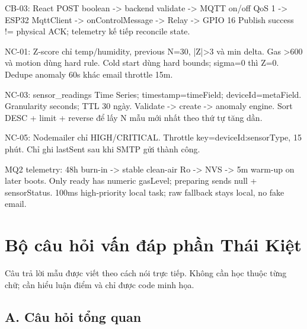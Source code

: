 \documentclass[11pt,oneside,openany]{book}
\newenvironment{Shaded}{\begin{snugshade}}{\end{snugshade}}
\newcommand{\NormalTok}[1]{\textcolor[rgb]{0.81,0.81,0.76}{#1}}
\renewenvironment{Shaded}{%
  \def\FrameCommand{\fboxsep=8pt\colorbox{shadecolor}}%
  \MakeFramed{\advance\hsize-\width\FrameRestore}%
}{\endMakeFramed}
\begin{document}
\begin{Shaded}
\begin{Highlighting}[]
\NormalTok{CB{-}03:}
\NormalTok{React POST boolean {-}\textgreater{} backend validate {-}\textgreater{} MQTT on/off QoS 1}
\NormalTok{{-}\textgreater{} ESP32 MqttClient {-}\textgreater{} onControlMessage {-}\textgreater{} Relay {-}\textgreater{} GPIO 16}
\NormalTok{Publish success != physical ACK; telemetry kế tiếp reconcile state.}

\NormalTok{NC{-}01:}
\NormalTok{Z{-}score chỉ temp/humidity, previous N=30, |Z|\textgreater{}3 và min delta.}
\NormalTok{Gas \textgreater{}600 và motion dùng hard rule.}
\NormalTok{Cold start dùng hard bounds; sigma=0 thì Z=0.}
\NormalTok{Dedupe anomaly 60s khác email throttle 15m.}

\NormalTok{NC{-}03:}
\NormalTok{sensor\_readings Time Series; timestamp=timeField; deviceId=metaField.}
\NormalTok{Granularity seconds; TTL 30 ngày.}
\NormalTok{Validate {-}\textgreater{} create {-}\textgreater{} anomaly engine.}
\NormalTok{Sort DESC + limit + reverse để lấy N mẫu mới nhất theo thứ tự tăng dần.}

\NormalTok{NC{-}05:}
\NormalTok{Nodemailer chỉ HIGH/CRITICAL.}
\NormalTok{Throttle key=deviceId:sensorType, 15 phút.}
\NormalTok{Chỉ ghi lastSent sau khi SMTP gửi thành công.}

\NormalTok{MQ2 telemetry:}
\NormalTok{48h burn{-}in {-}\textgreater{} stable clean{-}air Ro {-}\textgreater{} NVS {-}\textgreater{} 5m warm{-}up on later boots.}
\NormalTok{Only ready has numeric gasLevel; preparing sends null + sensorStatus.}
\NormalTok{100ms high{-}priority local task; raw fallback stays local, no fake email.}
\end{Highlighting}
\end{Shaded}

\chapter{Bộ câu hỏi vấn đáp phần Thái
Kiệt}\label{bux1ed9-cuxe2u-hux1ecfi-vux1ea5n-ux111uxe1p-phux1ea7n-thuxe1i-kiux1ec7t}

Câu trả lời mẫu được viết theo cách nói trực tiếp. Không cần học thuộc
từng chữ; cần hiểu luận điểm và chỉ được code minh họa.

\section{A. Câu hỏi tổng quan}\label{a-cuxe2u-hux1ecfi-tux1ed5ng-quan}
\end{document}
